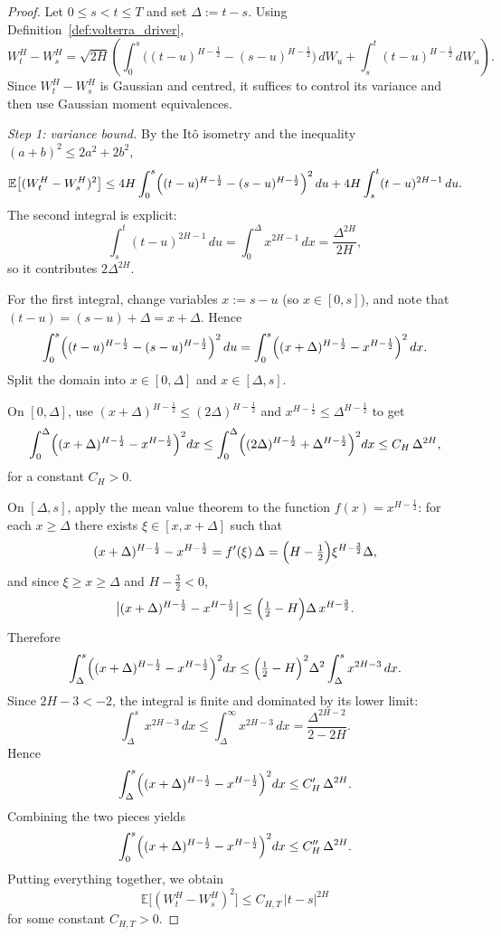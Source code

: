 \documentclass[12pt,a4paper]{article}
\theoremstyle{definition}
\theoremstyle{plain}
\theoremstyle{remark}
\theoremstyle{plain}
\begin{document}
\begin{proof}
Let $0\le s<t\le T$ and set $\Delta:=t-s$. Using Definition~\ref{def:volterra_driver},
\[
    W^H_t - W^H_s
    =
    \sqrt{2H}\left(
        \int_0^s \bigl((t-u)^{H-\frac12}-(s-u)^{H-\frac12}\bigr)\, dW_u
        +
        \int_s^t (t-u)^{H-\frac12}\, dW_u
    \right).
\]
Since $W^H_t-W^H_s$ is Gaussian and centred, it suffices to control its variance and then use Gaussian moment equivalences.

\emph{Step 1: variance bound.}
By the It\^o isometry and the inequality $(a+b)^2\le 2a^2+2b^2$,
\[
    \mathbb E\bigl[(W^H_t-W^H_s)^2\bigr]
    \le
    4H \int_0^s \Bigl((t-u)^{H-\frac12}-(s-u)^{H-\frac12}\Bigr)^2\, du
    +
    4H \int_s^t (t-u)^{2H-1}\, du.
\]
The second integral is explicit:
\[
    \int_s^t (t-u)^{2H-1}\, du
    =
    \int_0^{\Delta} x^{2H-1}\, dx
    =
    \frac{\Delta^{2H}}{2H},
\]
so it contributes $2\Delta^{2H}$.

For the first integral, change variables $x:=s-u$ (so $x\in[0,s]$), and note that $(t-u)=(s-u)+\Delta=x+\Delta$. Hence
\[
    \int_0^s \Bigl((t-u)^{H-\frac12}-(s-u)^{H-\frac12}\Bigr)^2\, du
    =
    \int_0^s \Bigl((x+\Delta)^{H-\frac12}-x^{H-\frac12}\Bigr)^2\, dx.
\]
Split the domain into $x\in[0,\Delta]$ and $x\in[\Delta,s]$.

On $[0,\Delta]$, use $(x+\Delta)^{H-\frac12}\le (2\Delta)^{H-\frac12}$ and $x^{H-\frac12}\le \Delta^{H-\frac12}$ to get
\[
    \int_0^\Delta \Bigl((x+\Delta)^{H-\frac12}-x^{H-\frac12}\Bigr)^2 dx
    \le
    \int_0^\Delta \Bigl((2\Delta)^{H-\frac12}+\Delta^{H-\frac12}\Bigr)^2 dx
    \le
    C_{H}\,\Delta^{2H},
\]
for a constant $C_H>0$.

On $[\Delta,s]$, apply the mean value theorem to the function $f(x)=x^{H-\frac12}$: for each $x\ge \Delta$ there exists $\xi\in[x,x+\Delta]$ such that
\[
    (x+\Delta)^{H-\frac12}-x^{H-\frac12}
    =
    f'(\xi)\,\Delta
    =
    \Bigl(H-\tfrac12\Bigr)\xi^{H-\frac32}\Delta,
\]
and since $\xi\ge x\ge \Delta$ and $H-\tfrac32<0$,
\[
    \bigl|(x+\Delta)^{H-\frac12}-x^{H-\frac12}\bigr|
    \le
    \Bigl(\tfrac12-H\Bigr)\Delta\,x^{H-\frac32}.
\]
Therefore
\[
    \int_\Delta^s \Bigl((x+\Delta)^{H-\frac12}-x^{H-\frac12}\Bigr)^2 dx
    \le
    \Bigl(\tfrac12-H\Bigr)^2\Delta^2 \int_\Delta^s x^{2H-3}\, dx.
\]
Since $2H-3<-2$, the integral is finite and dominated by its lower limit:
\[
    \int_\Delta^s x^{2H-3}\, dx
    \le
    \int_\Delta^\infty x^{2H-3}\, dx
    =
    \frac{\Delta^{2H-2}}{2-2H}.
\]
Hence
\[
    \int_\Delta^s \Bigl((x+\Delta)^{H-\frac12}-x^{H-\frac12}\Bigr)^2 dx
    \le
    C_H'\,\Delta^{2H}.
\]
Combining the two pieces yields
\[
    \int_0^s \Bigl((x+\Delta)^{H-\frac12}-x^{H-\frac12}\Bigr)^2 dx
    \le
    C_H''\,\Delta^{2H}.
\]
Putting everything together, we obtain
\[
    \mathbb E\bigl[(W^H_t-W^H_s)^2\bigr]
    \le
    C_{H,T}\,|t-s|^{2H}
\]
for some constant $C_{H,T}>0$.


\end{proof}
\end{document}
